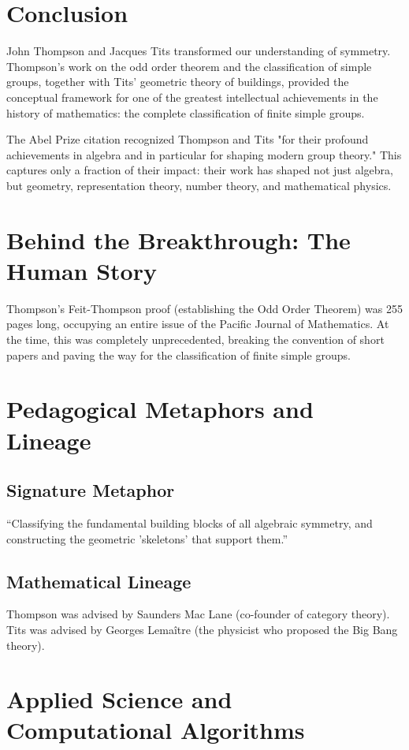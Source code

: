 \section{Conclusion}

John Thompson and Jacques Tits transformed our understanding of symmetry. Thompson's work on the odd order theorem and the classification of simple groups, together with Tits' geometric theory of buildings, provided the conceptual framework for one of the greatest intellectual achievements in the history of mathematics: the complete classification of finite simple groups.

The Abel Prize citation recognized Thompson and Tits "for their profound achievements in algebra and in particular for shaping modern group theory." This captures only a fraction of their impact: their work has shaped not just algebra, but geometry, representation theory, number theory, and mathematical physics.


\section{Behind the Breakthrough: The Human Story}
Thompson's Feit-Thompson proof (establishing the Odd Order Theorem) was 255 pages long, occupying an entire issue of the Pacific Journal of Mathematics. At the time, this was completely unprecedented, breaking the convention of short papers and paving the way for the classification of finite simple groups.

\section{Pedagogical Metaphors and Lineage}
\subsection{Signature Metaphor}
``Classifying the fundamental building blocks of all algebraic symmetry, and constructing the geometric 'skeletons' that support them.''

\subsection{Mathematical Lineage}
Thompson was advised by Saunders Mac Lane (co-founder of category theory). Tits was advised by Georges Lema\^itre (the physicist who proposed the Big Bang theory).

\section{Applied Science and Computational Algorithms}
